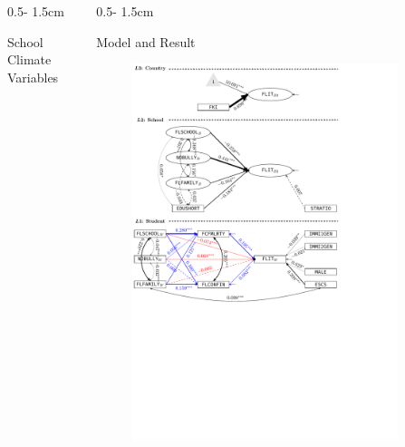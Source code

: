 \documentclass{uioposter}
\begin{document}
\begin{frame}
\begin{columns}[onlytextwidth]
\begin{column}{0.5\textwidth - 1.5cm}


    \begin{block}{School Climate Variables \parencite{wang:2016}}
        
    \end{block}

\end{column}

\begin{column}{0.5\textwidth - 1.5cm}

    \begin{block}{Model and Result}
        \begin{figure}
            \includegraphics[width=0.9\textwidth]{../Figures/Poster_result.pdf}
        \end{figure}
    \end{block}


\end{column}
\end{columns}
\end{frame}
\end{document}
